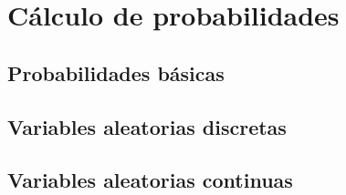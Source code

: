 \part{Cálculo de probabilidades}
\chapter{Probabilidades básicas}

\chapter{Variables aleatorias discretas}
\chapter{Variables aleatorias continuas}
